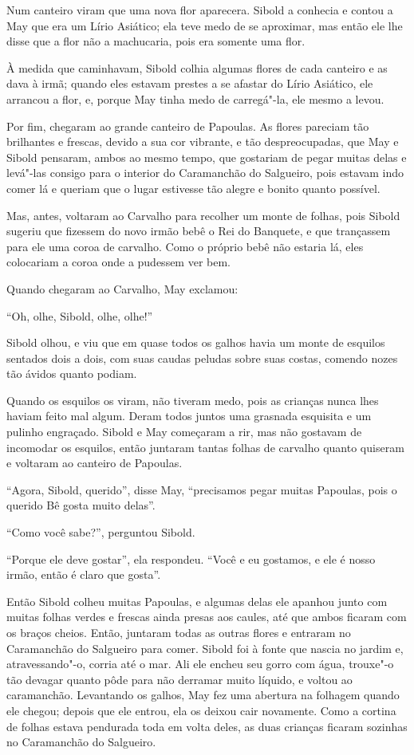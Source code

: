 Num canteiro viram que uma nova flor aparecera. Sibold a conhecia e
contou a May que era um Lírio Asiático; ela teve medo de se aproximar,
mas então ele lhe disse que a flor não a machucaria, pois era somente
uma flor.

À medida que caminhavam, Sibold colhia algumas flores de cada canteiro e
as dava à irmã; quando eles estavam prestes a se afastar do Lírio
Asiático, ele arrancou a flor, e, porque May tinha medo de carregá"-la,
ele mesmo a levou.

Por fim, chegaram ao grande canteiro de Papoulas. As flores pareciam tão
brilhantes e frescas, devido a sua cor vibrante, e tão despreocupadas,
que May e Sibold pensaram, ambos ao mesmo tempo, que gostariam de pegar
muitas delas e levá"-las consigo para o interior do Caramanchão do
Salgueiro, pois estavam indo comer lá e queriam que o lugar estivesse
tão alegre e bonito quanto possível.

Mas, antes, voltaram ao Carvalho para recolher um monte de folhas, pois
Sibold sugeriu que fizessem do novo irmão bebê o Rei do Banquete, e que
trançassem para ele uma coroa de carvalho. Como o próprio bebê não
estaria lá, eles colocariam a coroa onde a pudessem ver bem.

Quando chegaram ao Carvalho, May exclamou:

``Oh, olhe, Sibold, olhe, olhe!''

Sibold olhou, e viu que em quase todos os galhos havia um monte de
esquilos sentados dois a dois, com suas caudas peludas sobre suas
costas, comendo nozes tão ávidos quanto podiam.

Quando os esquilos os viram, não tiveram medo, pois as crianças nunca
lhes haviam feito mal algum. Deram todos juntos uma grasnada esquisita e
um pulinho engraçado. Sibold e May começaram a rir, mas não gostavam de
incomodar os esquilos, então juntaram tantas folhas de carvalho quanto
quiseram e voltaram ao canteiro de Papoulas.

``Agora, Sibold, querido'', disse May, ``precisamos pegar muitas
Papoulas, pois o querido Bê gosta muito delas''.

``Como você sabe?'', perguntou Sibold.

``Porque ele deve gostar'', ela respondeu. ``Você e eu gostamos, e ele é
nosso irmão, então é claro que gosta''.

Então Sibold colheu muitas Papoulas, e algumas delas ele apanhou junto
com muitas folhas verdes e frescas ainda presas aos caules, até que
ambos ficaram com os braços cheios. Então, juntaram todas as outras
flores e entraram no Caramanchão do Salgueiro para comer. Sibold foi à
fonte que nascia no jardim e, atravessando"-o, corria até o mar. Ali ele
encheu seu gorro com água, trouxe"-o tão devagar quanto pôde para não
derramar muito líquido, e voltou ao caramanchão. Levantando os galhos,
May fez uma abertura na folhagem quando ele chegou; depois que ele
entrou, ela os deixou cair novamente. Como a cortina de folhas estava
pendurada toda em volta deles, as duas crianças ficaram sozinhas no
Caramanchão do Salgueiro.

